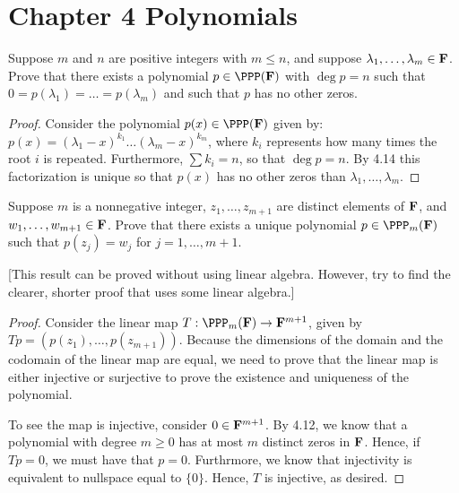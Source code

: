 \section*{Chapter 4 Polynomials}


\begin{exercise}{4}
  Suppose $m$ and $n$ are positive integers with $m\leq n$, and suppose $\lambda_1,\dots,\\ \lambda_m\in\mathbf{F}$. Prove that there exists a polynomial $p\in\PPP(\bF)$ with $\deg p=n$ such that $0=p(\lambda_1)=\dots=p(\lambda_m)$ and such that $p$ has no other zeros.
\end{exercise}
\begin{proof}
 Consider the polynomial $p(x)\in\PPP(\bF)$ given by: $p(x)=(\lambda_1-x)^{k_1}\dots(\lambda_m-x)^{k_m}$, where $k_i$ represents how many times the root $i$ is repeated. Furthermore, $\sum k_i=n$, so that $\deg p=n$. By 4.14 this factorization is unique so that $p(x)$ has no other zeros than $\lambda_1,\dots,\lambda_m$.
\end{proof}

\begin{exercise}{5}
  Suppose $m$ is a nonnegative integer, $z_1,\dots,z_{m+1}$ are distinct elements of $\mathbf{F}$, and $w_1,\dots,w_{m+1}\in\mathbf{F}$. Prove that there exists a unique polynomial $p\in\PPP_m(\bF)$ such that $p(z_j)=w_j$ for $j=1,\dots,m+1$.

  [This result can be proved without using linear algebra. However, try to find the clearer, shorter proof that uses some linear algebra.]
\end{exercise}
\begin{proof}
 Consider the linear map $T:\PPP_m(\bF)\rightarrow \bF^{m+1}$, given by \\$Tp=(p(z_1),\dots,p(z_{m+1}))$. Because the dimensions of the domain and the codomain of the linear map are equal, we need to prove that the linear map is either injective or surjective to prove the existence and uniqueness of the polynomial.

 To see the map is injective, consider $0\in\mathbf{F}^{m+1}$. By 4.12, we know that a polynomial with degree $m\geq 0$ has at most $m$ distinct zeros in $\mathbf{F}$. Hence, if $Tp=0$, we must have that $p=0$. Furthrmore, we know that injectivity is equivalent to nullspace equal to $\{0\}$. Hence, $T$ is injective, as desired.
\end{proof}


